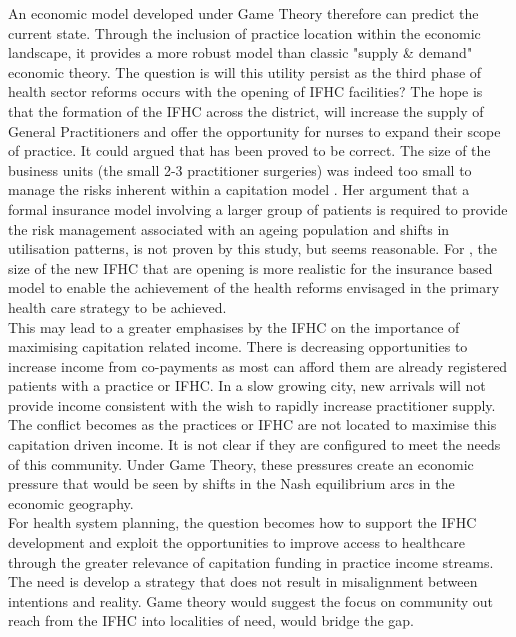 \documentclass[11pt,a4paper]{article}
\begin{document}
An economic model developed under Game Theory therefore can predict the current state. Through the inclusion of practice location within the economic landscape, it provides a more robust model than classic "supply \& demand" economic theory. The question is will this utility persist as the third phase of health sector reforms occurs with the opening of IFHC facilities? The hope is that the formation of the IFHC across the district, will increase the supply of General Practitioners and offer the opportunity for nurses to expand their scope of practice. It could argued that\citet{howell2005restructuring} has been proved to be correct. The size of the business units (the small 2-3 practitioner surgeries) was indeed too small to manage the risks inherent within a capitation model \citep{howell2005restructuring}. Her argument that a formal insurance model involving a larger group of patients is required to provide the risk management associated with an ageing population and shifts in utilisation patterns, is not proven by this study, but seems reasonable. For \citet{howell2005restructuring}, the size of the new IFHC that are opening is more realistic for the insurance based model to enable the achievement of the health reforms envisaged in the primary health care strategy to be achieved.\\

This may lead to a greater emphasises by the IFHC on the importance of maximising capitation related income. There is decreasing opportunities to increase income from co-payments as most can afford them are already registered patients with a practice or IFHC. In a slow growing city, new arrivals will not provide income consistent with the wish to rapidly increase practitioner supply. The conflict becomes as the practices or IFHC are not located to maximise this capitation driven income. It is not clear if they are configured to meet the needs of this community. Under Game Theory, these pressures create an economic pressure that would be seen by shifts in the Nash equilibrium arcs in the economic geography.\\

For health system planning, the question becomes how to support the IFHC development and exploit the opportunities to improve access to healthcare through the greater relevance of capitation funding in practice income streams. The need is develop a strategy that does not result in misalignment between intentions and reality\citep{kerr1995folly}. Game theory would suggest the focus on community out reach from the IFHC into localities of need, would bridge the gap.\\
\end{document}

